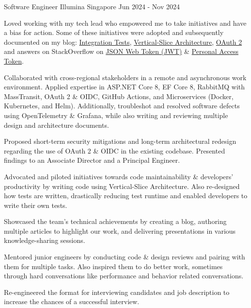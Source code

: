 \begin{cventries}
\cventry
{Software Engineer} %
{Illumina} %
{Singapore} %
{Jun 2024 - Nov 2024} %
{
  \begin{cvitems} %
    \item {Loved working with my tech lead who empowered me to take initiatives and have a bias for action. Some of these initiatives were adopted and subsequently documented on my blog: \href{https://bit.ly/zy-tests}{Integration Tests}, \href{https://bit.ly/zy-vsa}{Vertical-Slice Architecture}, \href{https://bit.ly/zy-oauth2}{OAuth 2} and answers on StackOverflow on \href{https://bit.ly/zy-jwt}{JSON Web Token (JWT)} \& \href{https://bit.ly/zy-pat}{Personal Access Token}.}
    \item {Collaborated with cross-regional stakeholders in a remote and asynchronous work environment. Applied expertise in ASP.NET Core 8, EF Core 8, RabbitMQ with MassTransit, OAuth 2 \& OIDC, GitHub Actions, and Microservices (Docker, Kubernetes, and Helm). Additionally, troubleshot and resolved software defects using OpenTelemetry \& Grafana, while also writing and reviewing multiple design and architecture documents.}
    \item {Proposed short-term security mitigations and long-term architectural redesign regarding the use of OAuth 2 \& OIDC in the existing codebase. Presented findings to an Associate Director and a Principal Engineer.}
    \item {Advocated and piloted initiatives towards code maintainability \& developers' productivity by writing code using Vertical-Slice Architecture. Also re-designed how tests are written, drastically reducing test runtime and enabled developers to write their own tests.}
    \item {Showcased the team's technical achievements by creating a blog, authoring multiple articles to highlight our work, and delivering presentations in various knowledge-sharing sessions.}
    \item {Mentored junior engineers by conducting code \& design reviews and pairing with them for multiple tasks. Also inspired them to do better work, sometimes through hard conversations like performance and behavior related conversations.}
    \item {Re-engineered the format for interviewing candidates and job description to increase the chances of a successful interview.}
  \end{cvitems}
}


\end{cventries}
